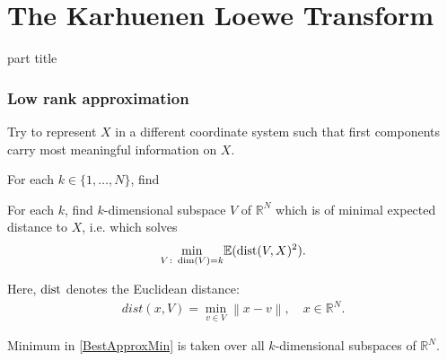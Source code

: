 \section{The Karhuenen Loewe Transform} 
\begin{frame}
 \vspace{12.0ex}
\begin{center}
\begin{beamercolorbox}[sep=12pt,center]{part title}
\insertsection\par
\end{beamercolorbox}
\end{center}
\end{frame}

\begin{frame}\frametitle{Low rank approximation}

\bit
\item Try to represent $X$ in a different coordinate system such that first components carry most meaningful information on $X$. 
\item[\iarrow]  For each $k\in\{1,\dots,N\}$, find 
\eit
{} 
\bit  
\item For each $k$, find $k$-dimensional subspace $V$ of $\mathbb{R}^N$ which is of minimal expected distance 
to $X$, i.e. which solves
\begin{align}\label{BestApproxMin}
\underset{V\colon \operatorname{dim}(V)=k}{\min}\mathbb{E}(\operatorname{dist}(V,X)^2).
\end{align} 
\item Here, $\operatorname{dist}$ denotes the Euclidean distance:
\begin{align*}
dist(x,V)=\min_{v\in V}\left\|x-v\right\|, \quad x\in\mathbb{R}^N. 
\end{align*} 
\item Minimum in \eqref{BestApproxMin} is taken over all $k$-dimensional subspaces of $\mathbb{R}^N$.
\eit
\end{frame}


